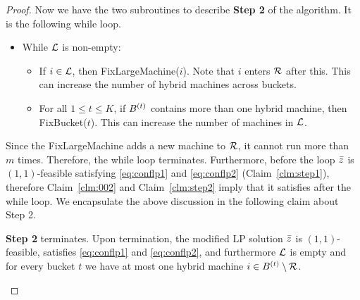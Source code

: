 \begin{proof}
	
%	
%	
\noindent
Now we have the two subroutines to describe {\bf Step 2} of the algorithm. It is the following while loop.
   \begin{itemize}[noitemsep]
   	\item[{}] While ${\cal L}$ is non-empty: 
   	\begin{itemize}[noitemsep]
   		\item If $i\in {\cal L}$, then {\sf FixLargeMachine}($i$). Note that $i$ enters ${\cal R}$ after this. This can increase the number of hybrid machines across buckets.
   		\item For all $1\leq t\leq K$, if $B^{(t)}$ contains more than one hybrid machine, then {\sf FixBucket}($t$). This can increase the number of machines in ${\cal L}$.
   	\end{itemize}
   \end{itemize}

%   
	  Since the {\sf FixLargeMachine} adds a new machine to ${\cal R}$, it cannot run more than $m$ times. Therefore, the while loop terminates. Furthermore, before the loop $\bar z$ is $(1,1)$-feasible satisfying \eqref{eq:conflp1} and \eqref{eq:conflp2} (Claim~\ref{clm:step1}), therefore Claim~\ref{clm:002} and Claim~\ref{clm:step2} imply that it satisfies after the while loop. We encapsulate the above discussion in the following claim about Step 2.
   \begin{claim}\label{clm:003}
   	{\bf Step 2} terminates. Upon termination, the modified LP solution $\bar z$ is $(1,1)$-feasible, satisfies \eqref{eq:conflp1} and \eqref{eq:conflp2}, and furthermore
   	${\cal L}$ is empty and for every bucket $t$ we have at most one hybrid machine $i\in B^{(t)}\setminus{\cal R}$.
   	\end{claim}
   	\smallskip
   	


\end{proof}
